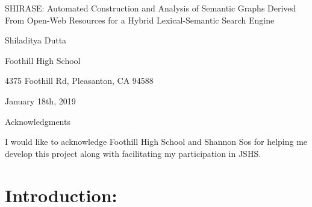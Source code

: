 \documentclass[12pt]{article}
\begin{document}
	\thispagestyle{empty}
	\begin{center}
	
	{\LARGE SHIRASE: Automated Construction and Analysis of Semantic Graphs Derived From Open-Web Resources for a Hybrid Lexical-Semantic Search Engine}
	\vspace{8mm}
	
	{\Large Shiladitya Dutta}
	\vspace{8mm}
	
	{\Large Foothill High School}
	\vspace{5mm}
	
	{\large 4375 Foothill Rd, Pleasanton, CA 94588}
	\vspace{20mm}
	
	{\large January 18th, 2019}
	\end{center}
    \pagebreak
    {\Large Acknowledgments}
    
    \vspace{3mm}
    \noindent
    I would like to acknowledge Foothill High School and Shannon Sos for helping me develop this project along with facilitating my participation in JSHS.
	\tableofcontents
	\thispagestyle{empty}
	\pagebreak
    \setcounter{page}{1}
	\section{Introduction:}
\end{document}
